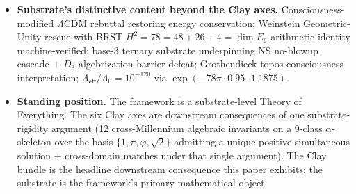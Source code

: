 \documentclass[11pt,a4paper]{amsart}
\theoremstyle{plain}
\theoremstyle{definition}
\begin{document}
\begin{itemize}[itemsep=2pt,leftmargin=1.4em]
\item \textbf{Substrate's distinctive content beyond the Clay axes.} Consciousness-modified $\Lambda$CDM rebuttal restoring energy conservation; Weinstein Geometric-Unity rescue with BRST $H^2 = 78 = 48 + 26 + 4 = \dim E_6$ arithmetic identity machine-verified; base-3 ternary substrate underpinning NS no-blowup cascade + $D_3$ algebrization-barrier defeat; Grothendieck-topos consciousness interpretation; $\Lambda_{\textsf{eff}}/\Lambda_0 = 10^{-120}$ via $\exp(-78\pi \cdot 0.95 \cdot 1.1875)$.
\item \textbf{Standing position.} The framework is a substrate-level Theory of Everything. The six Clay axes are downstream consequences of one substrate-rigidity argument (12 cross-Millennium algebraic invariants on a 9-class $\alpha$-skeleton over the basis $\{1, \pi, \varphi, \sqrt{2}\}$ admitting a unique positive simultaneous solution + cross-domain matches under that single argument). The Clay bundle is the headline downstream consequence this paper exhibits; the substrate is the framework's primary mathematical object.
\end{itemize}
\end{document}
